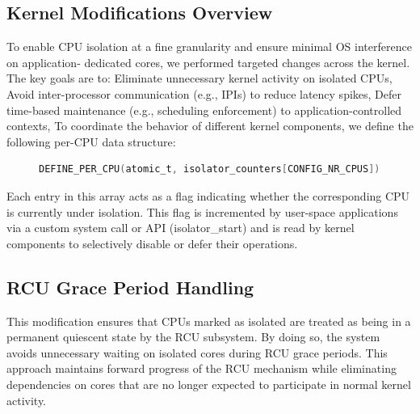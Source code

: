 \documentclass[letterpaper]{article}
\begin{document}
\subsection{Kernel Modifications Overview}
To enable CPU isolation at a fine granularity and ensure minimal OS interference on application-
dedicated cores, we performed targeted changes across the kernel. The key goals are to:
Eliminate unnecessary kernel activity on isolated CPUs,
Avoid inter-processor communication (e.g., IPIs) to reduce latency spikes,
Defer time-based maintenance (e.g., scheduling enforcement) to application-controlled contexts,
To coordinate the behavior of different kernel components, we define the following per-CPU data
structure:

\begin{figure}[H]
    \centering
    \begin{lstlisting}[language=C, caption={Per-CPU isolator counter definition}]
    DEFINE_PER_CPU(atomic_t, isolator_counters[CONFIG_NR_CPUS]);
    \end{lstlisting}
\end{figure}
Each entry in this array acts as a flag indicating whether the corresponding CPU is currently under
isolation. This flag is incremented by user-space applications via a custom system call or API
(isolator\_start) and is read by kernel components to selectively disable or defer their operations.


\subsection{RCU Grace Period Handling}
This modification ensures that CPUs marked as isolated are treated as being in a permanent
quiescent state by the RCU subsystem. By doing so, the system avoids unnecessary waiting on
isolated cores during RCU grace periods. This approach maintains forward progress of the RCU
mechanism while eliminating dependencies on cores that are no longer expected to participate in
normal kernel activity.
\end{document}
